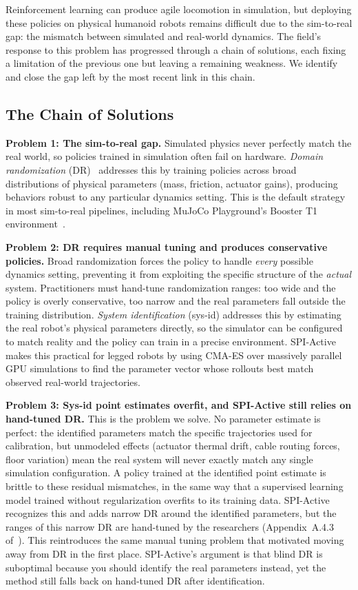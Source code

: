 \documentclass[10pt,twocolumn]{article}
\begin{document}
Reinforcement learning can produce agile locomotion in simulation, but deploying these policies on physical humanoid robots remains difficult due to the sim-to-real gap: the mismatch between simulated and real-world dynamics.
The field's response to this problem has progressed through a chain of solutions, each fixing a limitation of the previous one but leaving a remaining weakness.
We identify and close the gap left by the most recent link in this chain.

\subsection{The Chain of Solutions}

\textbf{Problem 1: The sim-to-real gap.}
Simulated physics never perfectly match the real world, so policies trained in simulation often fail on hardware.
\emph{Domain randomization} (DR)~\cite{peng2018sim2real} addresses this by training policies across broad distributions of physical parameters (mass, friction, actuator gains), producing behaviors robust to any particular dynamics setting.
This is the default strategy in most sim-to-real pipelines, including MuJoCo Playground's Booster T1 environment~\cite{zakka2025playground}.

\textbf{Problem 2: DR requires manual tuning and produces conservative policies.}
Broad randomization forces the policy to handle \emph{every} possible dynamics setting, preventing it from exploiting the specific structure of the \emph{actual} system.
Practitioners must hand-tune randomization ranges: too wide and the policy is overly conservative, too narrow and the real parameters fall outside the training distribution.
\emph{System identification} (sys-id) addresses this by estimating the real robot's physical parameters directly, so the simulator can be configured to match reality and the policy can train in a precise environment.
SPI-Active~\cite{sobanbabu2025spiactive} makes this practical for legged robots by using CMA-ES over massively parallel GPU simulations to find the parameter vector whose rollouts best match observed real-world trajectories.

\textbf{Problem 3: Sys-id point estimates overfit, and SPI-Active still relies on hand-tuned DR.}
This is the problem we solve.
No parameter estimate is perfect: the identified parameters match the specific trajectories used for calibration, but unmodeled effects (actuator thermal drift, cable routing forces, floor variation) mean the real system will never exactly match any single simulation configuration.
A policy trained at the identified point estimate is brittle to these residual mismatches, in the same way that a supervised learning model trained without regularization overfits to its training data.
SPI-Active recognizes this and adds narrow DR around the identified parameters, but the ranges of this narrow DR are hand-tuned by the researchers (Appendix~A.4.3 of~\cite{sobanbabu2025spiactive}).
This reintroduces the same manual tuning problem that motivated moving away from DR in the first place.
SPI-Active's argument is that blind DR is suboptimal because you should identify the real parameters instead, yet the method still falls back on hand-tuned DR after identification.
\end{document}
